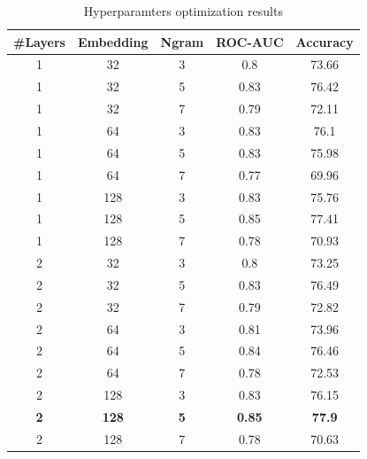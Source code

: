 \documentclass[10pt,journal,compsoc]{IEEEtran}
\begin{document}
\begin{table}[!htbp]
	\centering
	\begin{tabular}{||c c c c c||} 
		\#Layers & Embedding & Ngram & ROC-AUC & Accuracy \\ [0.5ex] 
		\hline\hline
		1      & 32                      & 3     & 0.8     & 73.66    \\
		1      & 32                      & 5     & 0.83    & 76.42    \\
		1      & 32                      & 7     & 0.79    & 72.11    \\
		1      & 64                      & 3     & 0.83    & 76.1     \\
		1      & 64                      & 5     & 0.83    & 75.98    \\
		1      & 64                      & 7     & 0.77    & 69.96    \\
		1      & 128                     & 3     & 0.83    & 75.76    \\
		1      & 128                     & 5     & 0.85    & 77.41    \\
		1      & 128                     & 7     & 0.78    & 70.93    \\
		2      & 32                      & 3     & 0.8     & 73.25    \\
		2      & 32                      & 5     & 0.83    & 76.49    \\
		2      & 32                      & 7     & 0.79    & 72.82    \\
		2      & 64                      & 3     & 0.81    & 73.96    \\
		2      & 64                      & 5     & 0.84    & 76.46    \\
		2      & 64                      & 7     & 0.78    & 72.53    \\
		2      & 128                     & 3     & 0.83    & 76.15    \\
		\textbf{2} & \textbf{128}            & \textbf{5} & \textbf{0.85} & \textbf{77.9} \\
		2      & 128                     & 7     & 0.78    & 70.63    \\[1ex]
	\end{tabular}
	\caption{Hyperparamters optimization results}
	\label{table:hyper_results}
\end{table}
\end{document}
